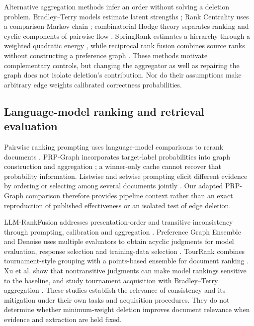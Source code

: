 \documentclass[pdflatex,iicol,sn-basic,Numbered]{sn-jnl}
\begin{document}
Alternative aggregation methods infer an order without solving a deletion problem. Bradley--Terry models estimate latent strengths \cite{bradley1952rank,hunter2004mm}; Rank Centrality uses a comparison Markov chain \cite{negahban2017rankcentrality}; combinatorial Hodge theory separates ranking and cyclic components of pairwise flow \cite{jiang2011hodge}. SpringRank estimates a hierarchy through a weighted quadratic energy \cite{debacco2018springrank}, while reciprocal rank fusion combines source ranks without constructing a preference graph \cite{cormack2009rrf}. These methods motivate complementary controls, but changing the aggregator as well as repairing the graph does not isolate deletion's contribution. Nor do their assumptions make arbitrary edge weights calibrated correctness probabilities.

\subsection{Language-model ranking and retrieval evaluation}
Pairwise ranking prompting uses language-model comparisons to rerank documents \cite{qin-etal-2024-large}. PRP-Graph incorporates target-label probabilities into graph construction and aggregation \cite{luo2024prpgraph}; a winner-only cache cannot recover that probability information. Listwise and setwise prompting elicit different evidence by ordering or selecting among several documents jointly \cite{sun-etal-2023-chatgpt,zhuang2024setwise}. Our adapted PRP-Graph comparison therefore provides pipeline context rather than an exact reproduction of published effectiveness or an isolated test of edge deletion.

LLM-RankFusion addresses presentation-order and transitive inconsistency through prompting, calibration and aggregation \cite{zeng2026llmrankfusion}. Preference Graph Ensemble and Denoise uses multiple evaluators to obtain acyclic judgments for model evaluation, response selection and training-data selection \cite{hu2026acyclic}. TourRank combines tournament-style grouping with a points-based ensemble for document ranking \cite{chen2025tourrank}. Xu et al. show that nontransitive judgments can make model rankings sensitive to the baseline, and study tournament acquisition with Bradley--Terry aggregation \cite{xu2025nontransitivity}. These studies establish the relevance of consistency and its mitigation under their own tasks and acquisition procedures. They do not determine whether minimum-weight deletion improves document relevance when evidence and extraction are held fixed.
\end{document}

